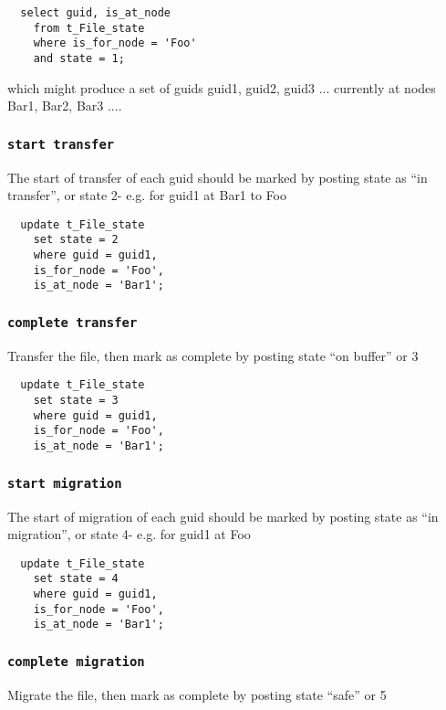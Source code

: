\documentclass{cmspaper}
\begin{document}
{\small\begin{verbatim}
  select guid, is_at_node
    from t_File_state
    where is_for_node = 'Foo'
    and state = 1;
\end{verbatim}}

which might produce a set of guids {guid1, guid2, guid3 ...} currently at nodes {Bar1, Bar2, Bar3 ...}. 

\subsubsection{\textbf{\texttt{start transfer}}}
The start of transfer of each guid should be marked by posting state as ``in transfer'', or state 2- e.g. for guid1 at Bar1 to Foo

{\small\begin{verbatim}
  update t_File_state
    set state = 2
    where guid = guid1,
    is_for_node = 'Foo',
    is_at_node = 'Bar1';
  \end{verbatim}}

\subsubsection{\textbf{\texttt{complete transfer}}}
Transfer the file, then mark as complete by posting state ``on buffer'' or 3

{\small\begin{verbatim}
  update t_File_state
    set state = 3
    where guid = guid1,
    is_for_node = 'Foo',
    is_at_node = 'Bar1';
\end{verbatim}}

\subsubsection{\textbf{\texttt{start migration}}}
The start of migration of each guid should be marked by posting state as ``in migration'', or state 4- e.g. for guid1 at Foo

{\small\begin{verbatim}
  update t_File_state
    set state = 4
    where guid = guid1,
    is_for_node = 'Foo',
    is_at_node = 'Bar1';
\end{verbatim}}

\subsubsection{\textbf{\texttt{complete migration}}}
Migrate the file, then mark as complete by posting state ``safe'' or 5
\end{document}

